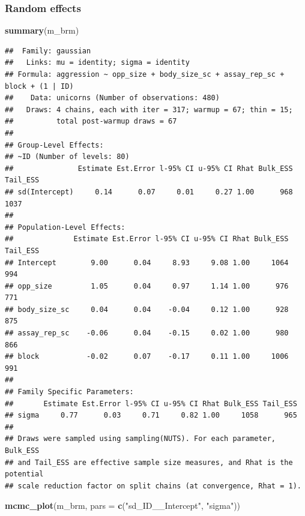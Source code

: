 \documentclass[
  12pt,
]{book}
\newenvironment{Shaded}{\begin{snugshade}}{\end{snugshade}}
\newcommand{\DataTypeTok}[1]{\textcolor[rgb]{0.13,0.29,0.53}{#1}}
\newcommand{\KeywordTok}[1]{\textcolor[rgb]{0.13,0.29,0.53}{\textbf{#1}}}
\newcommand{\NormalTok}[1]{#1}
\newcommand{\StringTok}[1]{\textcolor[rgb]{0.31,0.60,0.02}{#1}}
\begin{document}
\hypertarget{random-effects-3}{%
\subsubsection{Random effects}\label{random-effects-3}}

\begin{Shaded}
\begin{Highlighting}[]
\KeywordTok{summary}\NormalTok{(m\_brm)}
\end{Highlighting}
\end{Shaded}

\begin{verbatim}
##  Family: gaussian 
##   Links: mu = identity; sigma = identity 
## Formula: aggression ~ opp_size + body_size_sc + assay_rep_sc + block + (1 | ID) 
##    Data: unicorns (Number of observations: 480) 
##   Draws: 4 chains, each with iter = 317; warmup = 67; thin = 15;
##          total post-warmup draws = 67
## 
## Group-Level Effects: 
## ~ID (Number of levels: 80) 
##               Estimate Est.Error l-95% CI u-95% CI Rhat Bulk_ESS Tail_ESS
## sd(Intercept)     0.14      0.07     0.01     0.27 1.00      968     1037
## 
## Population-Level Effects: 
##              Estimate Est.Error l-95% CI u-95% CI Rhat Bulk_ESS Tail_ESS
## Intercept        9.00      0.04     8.93     9.08 1.00     1064      994
## opp_size         1.05      0.04     0.97     1.14 1.00      976      771
## body_size_sc     0.04      0.04    -0.04     0.12 1.00      928      875
## assay_rep_sc    -0.06      0.04    -0.15     0.02 1.00      980      866
## block           -0.02      0.07    -0.17     0.11 1.00     1006      991
## 
## Family Specific Parameters: 
##       Estimate Est.Error l-95% CI u-95% CI Rhat Bulk_ESS Tail_ESS
## sigma     0.77      0.03     0.71     0.82 1.00     1058      965
## 
## Draws were sampled using sampling(NUTS). For each parameter, Bulk_ESS
## and Tail_ESS are effective sample size measures, and Rhat is the potential
## scale reduction factor on split chains (at convergence, Rhat = 1).
\end{verbatim}

\begin{Shaded}
\begin{Highlighting}[]
\KeywordTok{mcmc\_plot}\NormalTok{(m\_brm, }\DataTypeTok{pars =} \KeywordTok{c}\NormalTok{(}\StringTok{"sd\_ID\_\_Intercept"}\NormalTok{, }\StringTok{"sigma"}\NormalTok{))}
\end{Highlighting}
\end{Shaded}
\end{document}
